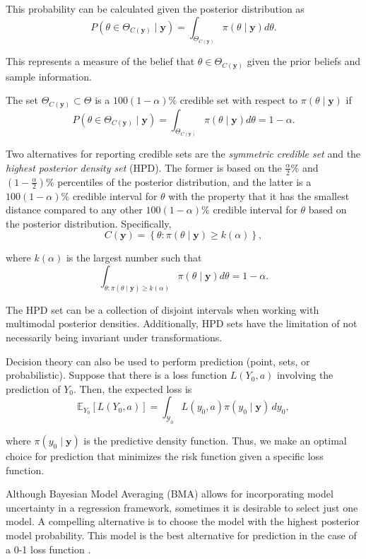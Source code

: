This probability can be calculated given the posterior distribution as
\[
P(\theta \in \Theta_{C(\mathbf{y})} \mid \mathbf{y}) = \int_{\Theta_{C(\mathbf{y})}} \pi(\theta \mid \mathbf{y}) d\theta.
\]

This represents a measure of the belief that $\theta \in \Theta_{C(\mathbf{y})}$ given the prior beliefs and sample information.

The set $\Theta_{C(\mathbf{y})} \subset \Theta$ is a $100(1-\alpha)\%$ credible set with respect to $\pi(\theta \mid \mathbf{y})$ if
\[
P(\theta \in \Theta_{C(\mathbf{y})} \mid \mathbf{y}) = \int_{\Theta_{C(\mathbf{y})}} \pi(\theta \mid \mathbf{y}) d\theta = 1 - \alpha.
\]

Two alternatives for reporting credible sets are the \textit{symmetric credible set} and the \textit{highest posterior density set} (HPD). The former is based on the $\frac{\alpha}{2}\%$ and $(1 - \frac{\alpha}{2})\%$ percentiles of the posterior distribution, and the latter is a $100(1 - \alpha)\%$ credible interval for $\theta$ with the property that it has the smallest distance compared to any other $100(1 - \alpha)\%$ credible interval for $\theta$ based on the posterior distribution. Specifically,
\[
C(\mathbf{y}) = \left\{ \theta : \pi(\theta \mid \mathbf{y}) \geq k(\alpha) \right\},
\]

where $k(\alpha)$ is the largest number such that
\[
\int_{\theta : \pi(\theta \mid \mathbf{y}) \geq k(\alpha)} \pi(\theta \mid \mathbf{y}) d\theta = 1 - \alpha.
\]

The HPD set can be a collection of disjoint intervals when working with multimodal posterior densities. Additionally, HPD sets have the limitation of not necessarily being invariant under transformations.

Decision theory can also be used to perform prediction (point, sets, or probabilistic). Suppose that there is a loss function $L(Y_0, a)$ involving the prediction of $Y_0$. Then, the expected loss is
\[
\mathbb{E}_{Y_0}[L(Y_0, a)] = \int_{\mathcal{Y}_0} L(y_0, a) \pi(y_0 \mid \mathbf{y}) \, dy_0,
\]

where $\pi(y_0 \mid \mathbf{y})$ is the predictive density function. Thus, we make an optimal choice for prediction that minimizes the risk function given a specific loss function.

Although Bayesian Model Averaging (BMA) allows for incorporating model uncertainty in a regression framework, sometimes it is desirable to select just one model. A compelling alternative is to choose the model with the highest posterior model probability. This model is the best alternative for prediction in the case of a 0-1 loss function \cite{Clyde2004}.

